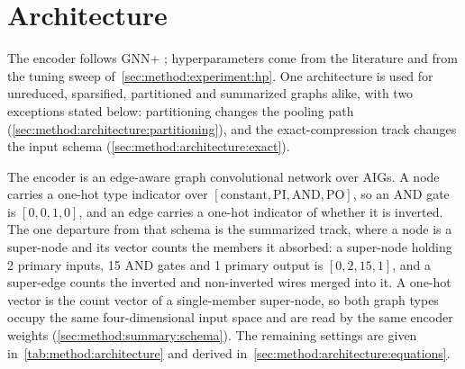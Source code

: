 \section{Architecture}
\label{sec:method:architecture}
The encoder follows GNN+ \citep{luo2024gnnplus}; hyperparameters come from the literature
and from the tuning sweep of~\ref{sec:method:experiment:hp}. One architecture is used for
unreduced, sparsified, partitioned and summarized graphs alike, with two exceptions stated
below: partitioning changes the pooling path (\ref{sec:method:architecture:partitioning}),
and the exact-compression track changes the input schema
(\ref{sec:method:architecture:exact}).

The encoder is an edge-aware graph convolutional network over AIGs. A node carries a one-hot
type indicator over $[\text{constant}, \text{PI}, \text{AND}, \text{PO}]$, so an AND gate is
$[0, 0, 1, 0]$, and an edge carries a one-hot indicator of whether it is inverted. The one
departure from that schema is the summarized track, where a node is a super-node and its
vector counts the members it absorbed: a super-node holding 2 primary inputs, 15 AND gates
and 1 primary output is $[0, 2, 15, 1]$, and a super-edge counts the inverted and
non-inverted wires merged into it. A one-hot vector is the count vector of a single-member
super-node, so both graph types occupy the same four-dimensional input space and are read by
the same encoder weights (\ref{sec:method:summary:schema}). The remaining settings are given
in~\ref{tab:method:architecture} and derived
in~\ref{sec:method:architecture:equations}.

